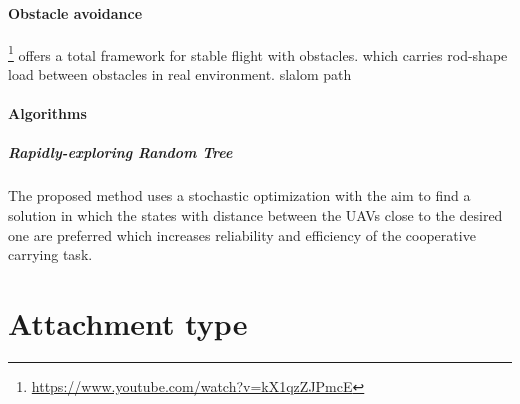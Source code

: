 \documentclass{article}
\begin{document}
		\paragraph{Obstacle avoidance}
			\cite{lee-2018-an-integrated-framework-for-cooperative-aerial-manipulators-in-unknown-environments}\footnote{\url{https://www.youtube.com/watch?v=kX1qzZJPmcE}} offers a total framework for stable flight with obstacles.
			\cite{spurny-2019-cooperative-transport-of-large-objects-by-a-pair-of-unmanned-aerial-systems-using-sampling-based-motion-planning} which carries rod-shape load between obstacles in real environment.
			\cite{loianno-2017-cooperative-transportation-using-small-quadrotors-using-monocular-vision-and-inertial-sensing}
			slalom path
		\paragraph{Algorithms}
			\subparagraph{Rapidly-exploring Random Tree \cite{lavalle-1998-rapidly-exploring-random-trees-a-new-tool-for-path-planning}}
			 \cite{spurny-2019-cooperative-transport-of-large-objects-by-a-pair-of-unmanned-aerial-systems-using-sampling-based-motion-planning} The proposed method uses a stochastic optimization with the aim to find a solution in which the states with distance between the UAVs close to the desired one are preferred which increases reliability and efficiency of the cooperative carrying task. 
	\section{Attachment type}
\end{document}
